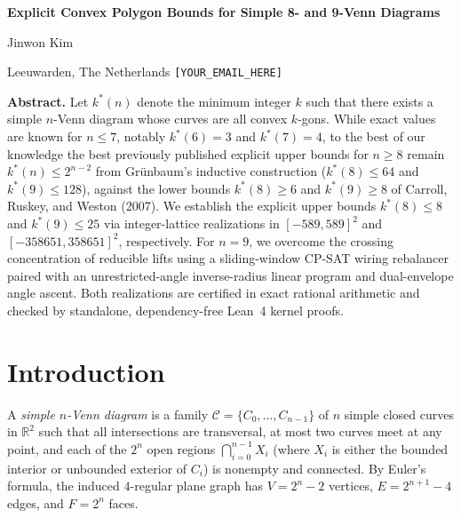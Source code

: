 \documentclass[11pt]{article}
\begin{document}
\begin{center}
{\fontsize{14}{17}\selectfont\bfseries Explicit Convex Polygon Bounds for Simple 8- and 9-Venn Diagrams\par}
\vspace{0.5em}
{\fontsize{12}{14}\selectfont Jinwon Kim\par}
\vspace{0.2em}
{\fontsize{11}{13}\selectfont Leeuwarden, The Netherlands \quad \texttt{[YOUR\_EMAIL\_HERE]}\par}
\end{center}

\vspace{0.8em}

\noindent\textbf{Abstract.}
Let $k^*(n)$ denote the minimum integer $k$ such that there exists a simple $n$-Venn diagram whose curves are all convex $k$-gons. While exact values are known for $n \le 7$, notably $k^*(6)=3$ and $k^*(7)=4$, to the best of our knowledge the best previously published explicit upper bounds for $n \ge 8$ remain $k^*(n) \le 2^{n-2}$ from Gr\"unbaum's inductive construction ($k^*(8) \le 64$ and $k^*(9) \le 128$), against the lower bounds $k^*(8) \ge 6$ and $k^*(9) \ge 8$ of Carroll, Ruskey, and Weston (2007). We establish the explicit upper bounds $k^*(8) \le 8$ and $k^*(9) \le 25$ via integer-lattice realizations in $[-589, 589]^2$ and $[-358651, 358651]^2$, respectively. For $n=9$, we overcome the crossing concentration of reducible lifts using a sliding-window CP-SAT wiring rebalancer paired with an unrestricted-angle inverse-radius linear program and dual-envelope angle ascent. Both realizations are certified in exact rational arithmetic and checked by standalone, dependency-free Lean~4 kernel proofs.

\section{Introduction}

A \emph{simple $n$-Venn diagram} is a family $\mathcal{C} = \{C_0, \dots, C_{n-1}\}$ of $n$ simple closed curves in $\mathbb{R}^2$ such that all intersections are transversal, at most two curves meet at any point, and each of the $2^n$ open regions $\bigcap_{i=0}^{n-1} X_i$ (where $X_i$ is either the bounded interior or unbounded exterior of $C_i$) is nonempty and connected. By Euler's formula, the induced $4$-regular plane graph has $V = 2^n - 2$ vertices, $E = 2^{n+1} - 4$ edges, and $F = 2^n$ faces.
\end{document}
